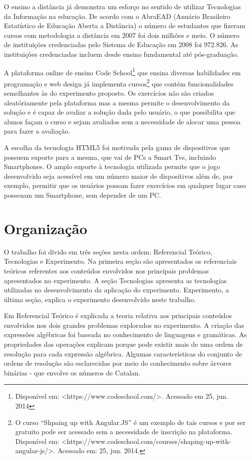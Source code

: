 	O ensino a distância já demonstra um esforço no sentido de utilizar Tecnologias da Informação na educação. De acordo com o AbraEAD (Anuário Brasileiro Estatístico de Educação Aberta a Distância) o número de estudantes que fizeram cursos com metodologia a distância em 2007 foi dois milhões e meio. O número de instituições credenciadas pelo Sistema de Educação em 2008 foi 972.826. As instituições credenciadas incluem desde ensino fundamental até pós-graduação. \cite{eadBr}

	A plataforma online de ensino Code School\footnote{Disponível em: <https://www.codeschool.com/>. Acessado em 25, jun. 2014} que ensina diversas habilidades em programação e web design já implementa cursos\footnote{O curso “Shpaing up with Angular.JS” é um exemplo de tais cursos e por ser gratuito pode ser acessado sem a necessidade de inscrição na plataforma. Disponível em: <https://www.codeschool.com/courses/shaping-up-with-angular-js/>. Acessado em: 25, jun. 2014.} que contém funcionalidades semelhantes às do experimento proposto. Os exercícios não são criados aleatóriamente pela plataforma mas a mesma permite o desenvolvimento da solução e é capaz de avaliar a solução dada pelo usuário, o que possibilita que alunos façam o curso e sejam avaliados sem a necessidade de alocar uma pessoa para fazer a avaliação.
	
	A escolha da tecnologia HTML5 foi motivada pela gama de dispositivos que possuem suporte para a mesma, que vai de PCs a Smart Tvs, incluindo Smartphones. O amplo suporte à tecnologia utilizada permite que o jogo desenvolvido seja acessível em um número maior de dispositivos além de, por exemplo, permitir que os usuários possam fazer exercícios em qualquer lugar caso posssuam um Smartphone, sem depender de um PC.
	
\section{Organização}
O trabalho foi divido em três seções nesta ordem: Referencial Teórico, Tecnologias e Experimento. Na primeira seção são apresentados os referenciais teóricos referentes aos conteúdos envolvidos nos principais problemas apresentados no experimento. A seção Tecnologias apresenta as tecnologias utilizadas no desenvolvimento da aplicação do experimento. Experimento, a última seção, explica o experimento desenvolvido neste trabalho. 

Em Referencial Teórico é explicada a teoria relativa aos principais conteúdos envolvidos nos dois grandes problemas explorados no experimento. A criação das expressões algébricas foi baseada no conhecimento de linguagens e gramáticas. As propriedades das operações explicam porque pode existir mais de uma ordem de resolução para cada expressão algébrica. Algumas características do conjunto de ordens de resolução são esclarecidas por meio do conhecimento sobre árvores binárias - que envolve os números de Catalan.

